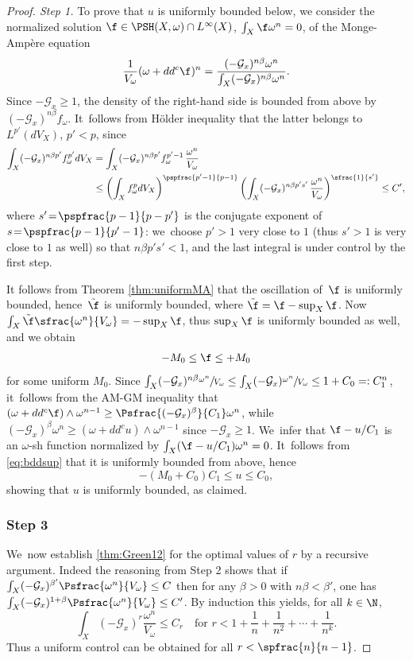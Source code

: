 \begin{proof}[Proof. Step 1]
To prove that $u$ is uniformly bounded below, we
consider the normalized solution $\f \in\PSH(X,\omega) \cap L^{\infty}(X)$, $\int_X \f \omega^n=0$,
of the Monge-Ampère equation
\[
\frac{1}{V_{\omega}} (\omega+dd^c \f)^n = \frac{(-{\mathcal G}_x)^{n\beta} \omega^n}{\int_X (-{\mathcal G}_x)^{n\beta} \omega^n}.
\]
Since $-{\mathcal G}_x \geq 1$, the density of the right-hand side is bounded from above by $(-{\mathcal G}_x)^{n\beta} f_{\omega}$. It~follows from Hölder inequality that the latter belongs to $L^{p'}(dV_X)$, $p'<p$, since
\begin{align*}
\int_X (-{\mathcal G}_x)^{n\beta p'} f_{\omega}^{p'} dV_X
&= \int_X (-{\mathcal G}_x)^{n\beta p'} f_{\omega}^{p'-1}\, \frac{\omega^n}{V_{\omega}} \\
&\leq  \left( \int_X f_{\omega}^p dV_X \right)^{\pspfrac{p'-1}{p-1}}
\left( \int_X (-{\mathcal G}_x)^{n\beta p's'}\, \frac{\omega^n}{V_{\omega}} \right)^{\sfrac{1}{s'}}
\leq C',
\end{align*}
where $s'\!=\!\pspfrac{p-1}{p-p'}$ is the conjugate exponent of $s\!=\!\pspfrac{p-1}{p'-1}$:
we~choose $p'>1$ very close to $1$ (thus $s'>1$ is very close to $1$ as well) so that
$n\beta p' s'<1$, and the last integral is under control by the first step.

It follows from Theorem \ref{thm:uniformMA} that the oscillation of~$\f$ is uniformly bounded,
hence~$\tilde{\f}$ is uniformly bounded, where $\tilde{\f}=\f-\sup_X \f$.
Now $\int_X \tilde{\f} \sfrac{\omega^n}{V_{\omega}}=-\sup_X \f$, thus $\sup_X \f$ is uniformly bounded as well,
and we obtain
\[
-M_0 \leq \f \leq +M_0
\]
for some uniform $M_0$.
Since $\int_X (-{\mathcal G}_x)^{n\beta} \sfrac{\omega^n}{V_{\omega}}
\leq \int_X (-{\mathcal G}_x) \sfrac{\omega^n}{V_{\omega}} \leq 1+C_0=:C_1^n$, it~follows from the AM-GM inequality that $(\omega+dd^c \f) \wedge \omega^{n-1} \geq \Psfrac{(-{\mathcal G}_x)^{\beta}}{C_1} \omega^n$,
while $ (-{\mathcal G}_x)^{\beta} \omega^n \geq (\omega+dd^c u) \wedge \omega^{n-1}$ since $-{\mathcal G}_x \geq 1$. We~infer that $\f-u/C_1$ is an $\omega$-sh function
normalized by $\int_X (\f-u/C_1) \omega^n=0$. It~follows from \eqref{eq:bddsup} that
it is uniformly bounded from above, hence
\[
-(M_0+C_0)C_1 \leq u \leq C_0,
\]
showing that $u$ is uniformly bounded, as claimed.

\subsubsection*{Step 3}
We~now establish \eqref{thm:Green12} for the optimal values of $r$ by a recursive argument.
Indeed the reasoning from Step 2 shows that if $\int_X (-{\mathcal G}_x)^{\beta'} \Psfrac{\omega^n}{V_{\omega}} \leq C$
then for any $\beta>0$ with $n\beta < \beta'$, one has $\int_X (-{\mathcal G}_x)^{1+\beta} \Psfrac{\omega^n}{V_{\omega}} \leq C'$.
By induction this yields, for all $k \in \N$,
\[
\int_X (-{\mathcal G}_x)^{r} \frac{\omega^n}{V_{\omega}} \leq C_r
\quad \text{for }
r<1+\frac{1}{n}+\frac{1}{n^2}+\cdots+\frac{1}{n^k}.
\]
Thus a uniform control can be obtained for all $r<\spfrac{n}{n-1}$.


\end{proof}
